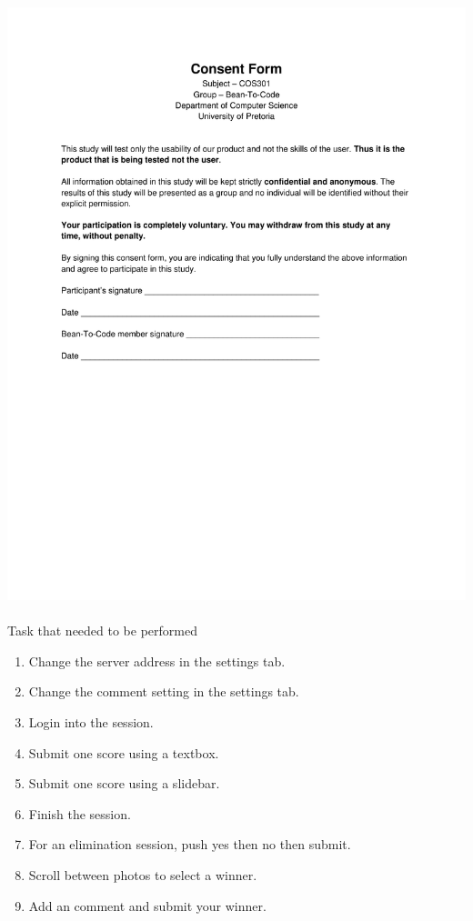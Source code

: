 \documentclass[10pt,a4paper]{article}
\begin{document}
\paragraph{} 
\advance\leftskip-1.3cm
\includegraphics[scale=0.55]{Pictures/ConsentForm.pdf}
\pagebreak
\paragraph{} Task that needed to be performed
\begin{enumerate}
\item Change the server address in the settings tab.
\item Change the comment setting in the settings tab.
\item Login into the session.
\item Submit one score using a textbox.
\item Submit one score using a slidebar.
\item Finish the session.
\item For an elimination session, push yes then no then submit.
\item Scroll between photos to select a winner.
\item Add an comment and submit your winner.
\end{enumerate}
\end{document}

